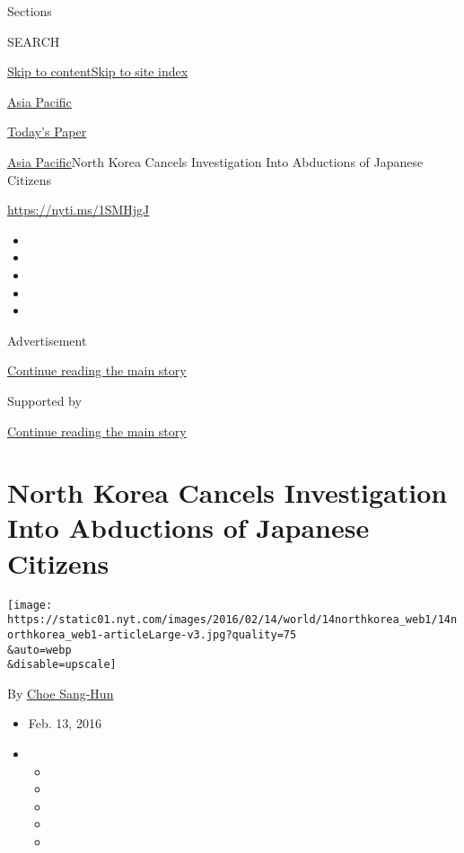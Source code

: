 Sections

SEARCH

\protect\hyperlink{site-content}{Skip to
content}\protect\hyperlink{site-index}{Skip to site index}

\href{https://www.nytimes.com/section/world/asia}{Asia Pacific}

\href{https://myaccount.nytimes.com/auth/login?response_type=cookie\&client_id=vi}{}

\href{https://www.nytimes.com/section/todayspaper}{Today's Paper}

\href{/section/world/asia}{Asia Pacific}\textbar{}North Korea Cancels
Investigation Into Abductions of Japanese Citizens

\url{https://nyti.ms/1SMHjgJ}

\begin{itemize}
\item
\item
\item
\item
\item
\end{itemize}

Advertisement

\protect\hyperlink{after-top}{Continue reading the main story}

Supported by

\protect\hyperlink{after-sponsor}{Continue reading the main story}

\hypertarget{north-korea-cancels-investigation-into-abductions-of-japanese-citizens}{%
\section{North Korea Cancels Investigation Into Abductions of Japanese
Citizens}\label{north-korea-cancels-investigation-into-abductions-of-japanese-citizens}}

\texttt{[image: https://static01.nyt.com/images/2016/02/14/world/14northkorea\_web1/14northkorea\_web1-articleLarge-v3.jpg?quality=75\\\&auto=webp\\\&disable=upscale]}

By \href{http://www.nytimes.com/by/choe-sang-hun}{Choe Sang-Hun}

\begin{itemize}
\item
  Feb. 13, 2016
\item
  \begin{itemize}
  \item
  \item
  \item
  \item
  \item
  \end{itemize}
\end{itemize}

